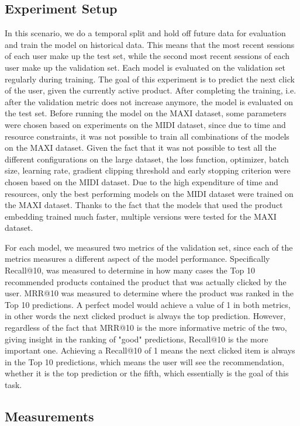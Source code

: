 \subsection{Experiment Setup}\label{sec:exp_setup}
In this scenario, we do a temporal split and hold off future data for evaluation and train the model on historical data.
This means that the most recent sessions of each user make up the test set, while the second most recent sessions of each user make up the validation set.
Each model is evaluated on the validation set regularly during training.
The goal of this experiment is to predict the next click of the user, given the currently active product.
After completing the training, i.e. after the validation metric does not increase anymore, the model is evaluated on the test set.
Before running the model on the MAXI dataset, some parameters were chosen based on experiments on the MIDI dataset, since due to time and resource constraints, it was not possible to train all combinations of the models on the MAXI dataset.
Given the fact that it was not possible to test all the different configurations on the large dataset, the loss function, optimizer, batch size, learning rate, gradient clipping threshold and early stopping criterion were chosen based on the MIDI dataset.
Due to the high expenditure of time and resources, only the best performing models on the MIDI dataset were trained on the MAXI dataset.
Thanks to the fact that the models that used the product embedding trained much faster, multiple versions were tested for the MAXI dataset.
\par
For each model, we measured two metrics of the validation set, since each of the metrics measures a different aspect of the model performance.
Specifically Recall@10, was measured to determine in how many cases the Top 10 recommended products contained the product that was actually clicked by the user.
MRR@10 was measured to determine where the product was ranked in the Top 10 predictions.
A perfect model would achieve a value of 1 in both metrics, in other words the next clicked product is always the top prediction.
However, regardless of the fact that MRR@10 is the more informative metric of the two, giving insight in the ranking of "good" predictions, Recall@10 is the more important one.
Achieving a Recall@10 of 1 means the next clicked item is always in the Top 10 predictions, which means the user will see the recommendation, whether it is the top prediction or the fifth, which essentially is the goal of this task.
\subsection{Measurements}

